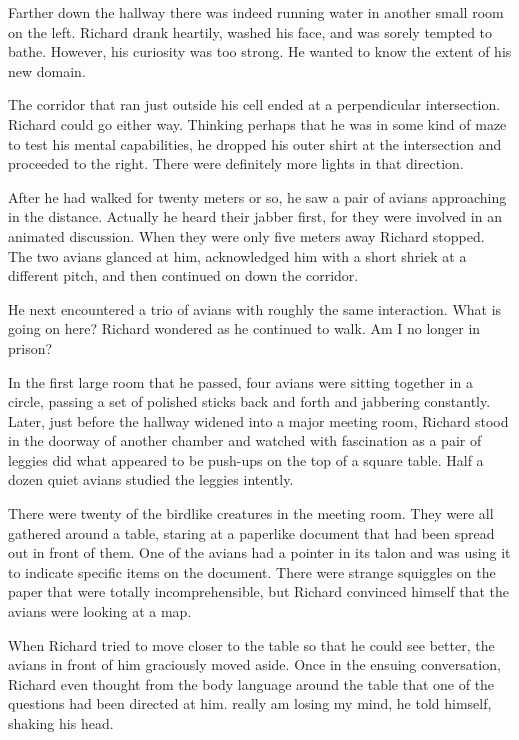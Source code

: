 \documentclass[]{article}
\begin{document}
{Farther down the hallway there was indeed running water in another small room on the left.  Richard drank heartily, washed his face, and was sorely tempted to bathe.  However, his curiosity was too strong.  He wanted to know the extent of his new domain.

The corridor that ran just outside his cell ended at a perpendicular intersection.  Richard could go either way.  Thinking perhaps that he was in some kind of maze to test his mental capabilities, he dropped his outer shirt at the intersection and proceeded to the right.  There were definitely more lights in that direction.

After he had walked for twenty meters or so, he saw a pair of avians approaching in the distance.  Actually he heard their jabber first, for they were involved in an animated discussion.  When they were only five meters away Richard stopped.  The two avians glanced at him, acknowledged him with a short shriek at a different pitch, and then continued on down the corridor.

He next encountered a trio of avians with roughly the same interaction.  What is going on here? Richard wondered as he continued to walk.  Am I no longer in prison?

In the first large room that he passed, four avians were sitting together in a circle, passing a set of polished sticks back and forth and jabbering constantly.  Later, just before the hallway widened into a major meeting room, Richard stood in the doorway of another chamber and watched with fascination as a pair of leggies did what appeared to be push-ups on the top of a square table.  Half a dozen quiet avians studied the leggies intently.

There were twenty of the birdlike creatures in the meeting room.  They were all gathered around a table, staring at a paperlike document that had been spread out in front of them.  One of the avians had a pointer in its talon and was using it to indicate specific items on the document.  There were strange squiggles on the paper that were totally incomprehensible, but Richard convinced himself that the avians were looking at a map.

When Richard tried to move closer to the table so that he could see better, the avians in front of him graciously moved aside.  Once in the ensuing conversation, Richard even thought from the body language around the table that one of the questions had been directed at him.  really am losing my mind, he told himself, shaking his head.

}
\end{document}
